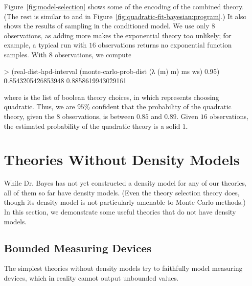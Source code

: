 Figure~\ref{fig:model-selection} shows some of the encoding of the combined theory.
(The rest is similar to  and  in Figure~\ref{fig:quadratic-fit-bayesian:program}.)
It also shows the results of sampling in the conditioned model.
We use only $8$ observations, as adding more makes the exponential theory too unlikely; for example, a typical run with $16$ observations returns no exponential function samples.
With $8$ observations, we compute
\begin{center}\singlespacing
\begin{schemedisplay}
> (real-dist-hpd-interval
   (monte-carlo-prob-dist (λ (m) m) ms ws)
   0.95)
0.8543205426853948
0.8858619943029161
\end{schemedisplay}
\end{center}
where  is the list of boolean theory choices, in which  represents choosing quadratic.
Thus, we are $95\%$ confident that the probability of the quadratic theory, given the $8$ observations, is between $0.85$ and $0.89$.
Given $16$ observations, the estimated probability of the quadratic theory is a solid $1$.


\section{Theories Without Density Models}

While Dr. Bayes has not yet constructed a density model for any of our theories, all of them so far have density models.
(Even the theory selection theory does, though its density model is not particularly amenable to Monte Carlo methods.)
In this section, we demonstrate some useful theories that do not have density models.

\subsection{Bounded Measuring Devices}

The simplest theories without density models try to faithfully model measuring devices, which in reality cannot output unbounded values.

